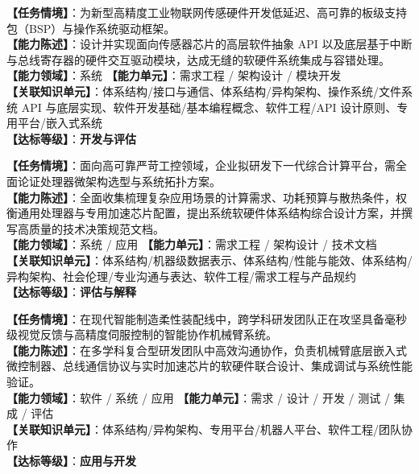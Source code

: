\begin{taskbox}[任务 7：传感器硬件集成的软硬件协同驱动接口与模块设计]
\textbf{【任务情境】}：为新型高精度工业物联网传感硬件开发低延迟、高可靠的板级支持包（BSP）与操作系统驱动框架。\\
\textbf{【能力陈述】}：设计并实现面向传感器芯片的高层软件抽象 API 以及底层基于中断与总线寄存器的硬件交互驱动模块，达成无缝的软硬件系统集成与容错处理。\\
\textbf{【能力领域】}：系统 \quad \textbf{【能力单元】}：需求工程 / 架构设计 / 模块开发\\
\textbf{【关联知识单元】}：体系结构/接口与通信、体系结构/异构架构、操作系统/文件系统 API 与底层实现、软件开发基础/基本编程概念、软件工程/API 设计原则、专用平台/嵌入式系统\\
\textbf{【达标等级】}：\textbf{开发与评估}
\end{taskbox}

\begin{taskbox}[任务 8：系统软硬件架构选型论证与技术方案设计规范撰写]
\textbf{【任务情境】}：面向高可靠严苛工控领域，企业拟研发下一代综合计算平台，需全面论证处理器微架构选型与系统拓扑方案。\\
\textbf{【能力陈述】}：全面收集梳理复杂应用场景的计算需求、功耗预算与散热条件，权衡通用处理器与专用加速芯片配置，提出系统软硬件体系结构综合设计方案，并撰写高质量的技术决策规范文档。\\
\textbf{【能力领域】}：系统 / 应用 \quad \textbf{【能力单元】}：需求工程 / 架构设计 / 技术文档\\
\textbf{【关联知识单元】}：体系结构/机器级数据表示、体系结构/性能与能效、体系结构/异构架构、社会伦理/专业沟通与表达、软件工程/需求工程与产品规约\\
\textbf{【达标等级】}：\textbf{评估与解释}
\end{taskbox}

\begin{taskbox}
\textbf{【任务情境】}：在现代智能制造柔性装配线中，跨学科研发团队正在攻坚具备毫秒级视觉反馈与高精度伺服控制的智能协作机械臂系统。\\
\textbf{【能力陈述】}：在多学科复合型研发团队中高效沟通协作，负责机械臂底层嵌入式微控制器、总线通信协议与实时加速芯片的软硬件联合设计、集成调试与系统性能验证。\\
\textbf{【能力领域】}：软件 / 系统 / 应用 \quad \textbf{【能力单元】}：需求 / 设计 / 开发 / 测试 / 集成 / 评估\\
\textbf{【关联知识单元】}：体系结构/异构架构、专用平台/机器人平台、软件工程/团队协作\\
\textbf{【达标等级】}：\textbf{应用与开发}
\end{taskbox}

